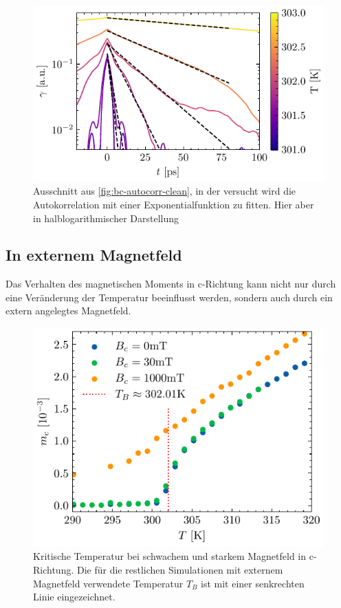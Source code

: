 \documentclass[main.tex]{subfiles}
\begin{document}

\begin{figure}[H]
    \centering
    \includegraphics{bilder/plots/temp_comparison/autocorrelation_cleaned_log.pdf}
    \caption{Ausschnitt aus \cref{fig:bc-autocorr-clean}, in der versucht wird die Autokorrelation mit einer Exponentialfunktion zu fitten. Hier aber in halblogarithmischer Darstellung}\label{fig:temp-autocorr-fit}
\end{figure}

\subsection{In externem Magnetfeld}

Das Verhalten des magnetischen Moments in c-Richtung kann nicht nur durch eine Veränderung der Temperatur beeinflusst werden, sondern auch durch ein extern angelegtes Magnetfeld.

\begin{figure}[H]
    \centering
    \includegraphics{bilder/plots/Bz_comparison/critical_temperature.pdf}
    \caption[Kritische Temperatur bei schwachem und starkem Magnetfeld in c-Richtung.]{Kritische Temperatur bei schwachem und starkem Magnetfeld in c-Richtung. Die für die restlichen Simulationen mit externem Magnetfeld verwendete Temperatur \(T_B\) ist mit einer senkrechten Linie eingezeichnet.}\label{fig:bc-crit-temp}
\end{figure}
\end{document}
